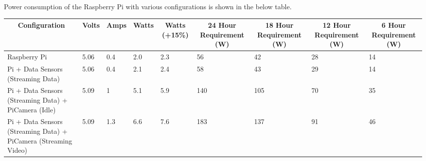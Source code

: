 \documentclass[10pt,a4paper]{article}
\begin{document}
Power consumption of the Raspberry Pi with various configurations is shown in the below table. 

\begin{table}[]
\centering
\begin{tabular}{lllllllll}
\hline
\multicolumn{1}{c}{\textbf{Configuration}}                      & \multicolumn{1}{c}{\textbf{Volts}} & \multicolumn{1}{c}{\textbf{Amps}} & \multicolumn{1}{c}{\textbf{Watts}} & \multicolumn{1}{c}{\textbf{Watts (+15\%)}} & \multicolumn{1}{c}{\textbf{24 Hour Requirement (W)}} & \multicolumn{1}{c}{\textbf{18 Hour Requirement (W)}} & \multicolumn{1}{c}{\textbf{12 Hour Requirement (W)}} & \multicolumn{1}{c}{\textbf{6 Hour Requirement (W)}} \\ \hline
Raspberry Pi                                                    & 5.06                               & 0.4                               & 2.0                                & 2.3                                        & 56                                                   & 42                                                   & 28                                                   & 14                                                  \\
Pi + Data Sensors (Streaming Data)                              & 5.06                               & 0.4                               & 2.1                                & 2.4                                        & 58                                                   & 43                                                   & 29                                                   & 14                                                  \\
Pi + Data Sensors (Streaming Data) + PiCamera (Idle)            & 5.09                               & 1                                 & 5.1                                & 5.9                                        & 140                                                  & 105                                                  & 70                                                   & 35                                                  \\
Pi + Data Sensors (Streaming Data) + PiCamera (Streaming Video) & 5.09                               & 1.3                               & 6.6                                & 7.6                                        & 183                                                  & 137                                                  & 91                                                   & 46                                                  \\

\end{tabular}
\end{table}
\end{document}
